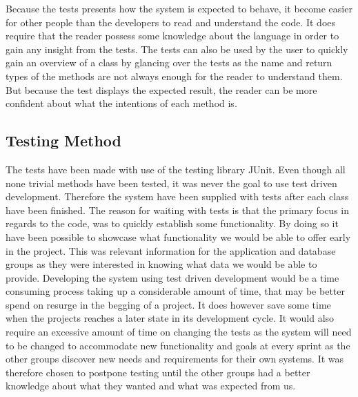 Because the tests presents how the system is expected to behave, it become easier for other people than the developers to read and understand the code.
It does require that the reader possess some knowledge about the language in order to gain any insight from the tests.
The tests can also be used by the user to quickly gain an overview of a class by glancing over the tests as the name and return types of the methods are not always enough for the reader to understand them.
But because the test displays the expected result, the reader can be more confident about what the intentions of each method is.

\subsection{Testing Method}
The tests have been made with use of the testing library JUnit\cite{junit4}.
Even though all none trivial methods have been tested, it was never the goal to use test driven development.
Therefore the system have been supplied with tests after each class have been finished. 
The reason for waiting with tests is that the primary focus in regards to the code, was to quickly establish some functionality. 
By doing so it have been possible to showcase what functionality we would be able to offer early in the project.%
This was relevant information for the application and database groups as they were interested in knowing what data we would be able to provide.
Developing the system using test driven development would be a time consuming process taking up a considerable amount of time, that may be better spend on resurge in the begging of a project.
It does however save some time when the projects reaches a later state in its development cycle.
It would also require an excessive amount of time on changing the tests as the system will need to be changed to accommodate new functionality and goals at every sprint as the other groups discover new needs and requirements for their own systems.
It was therefore chosen to postpone testing until the other groups had a better knowledge about what they wanted and what was expected from us.